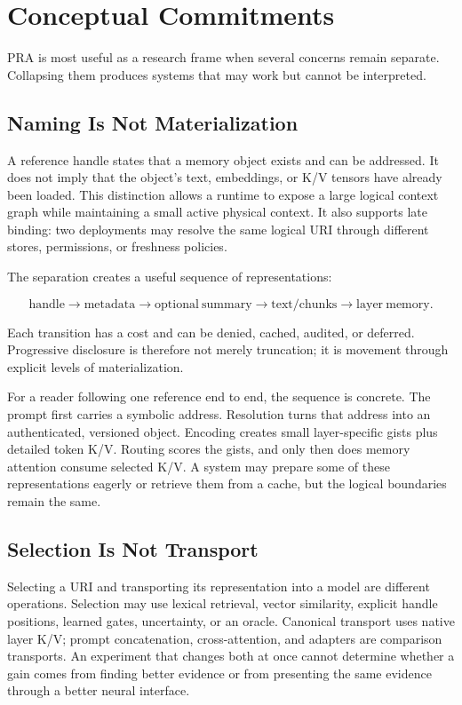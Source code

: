 \documentclass[11pt]{article}
\begin{document}
\section{Conceptual Commitments}

PRA is most useful as a research frame when several concerns remain separate. Collapsing them produces systems that may work but cannot be interpreted.

\subsection{Naming Is Not Materialization}

A reference handle states that a memory object exists and can be addressed. It does not imply that the object's text, embeddings, or K/V tensors have already been loaded. This distinction allows a runtime to expose a large logical context graph while maintaining a small active physical context. It also supports late binding: two deployments may resolve the same logical URI through different stores, permissions, or freshness policies.

The separation creates a useful sequence of representations:

\begin{equation}
\mathrm{handle} \rightarrow \mathrm{metadata} \rightarrow
\mathrm{optional\ summary} \rightarrow \mathrm{text/chunks} \rightarrow
\mathrm{layer\ memory}.
\end{equation}

Each transition has a cost and can be denied, cached, audited, or deferred. Progressive disclosure is therefore not merely truncation; it is movement through explicit levels of materialization.

For a reader following one reference end to end, the sequence is concrete.  The prompt
first carries a symbolic address.  Resolution turns that address into an authenticated,
versioned object.  Encoding creates small layer-specific gists plus detailed token K/V.
Routing scores the gists, and only then does memory attention consume selected K/V.  A
system may prepare some of these representations eagerly or retrieve them from a cache,
but the logical boundaries remain the same.

\subsection{Selection Is Not Transport}

Selecting a URI and transporting its representation into a model are different operations. Selection may use lexical retrieval, vector similarity, explicit handle positions, learned gates, uncertainty, or an oracle. Canonical transport uses native layer K/V; prompt concatenation, cross-attention, and adapters are comparison transports. An experiment that changes both at once cannot determine whether a gain comes from finding better evidence or from presenting the same evidence through a better neural interface.
\end{document}
